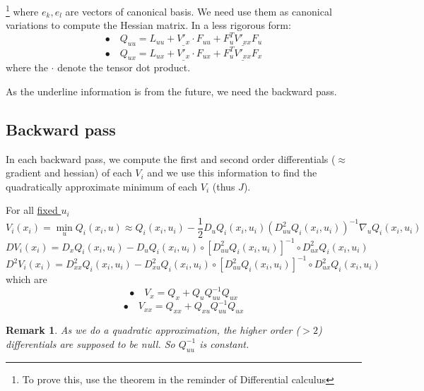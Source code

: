 \documentclass{report}
\newtheorem*{remark}{Remark}
\begin{document}
\footnote{To prove this, use the theorem in the reminder of Differential calculus}
where $e_k, e_l$ are vectors of canonical basis. We need use them as canonical variations to compute the Hessian matrix. In a less rigorous form:
\begin{equation}
\bullet \quad Q_{uu} = L_{uu} + \underline{V'_x} \cdot F_{uu} + F_u^T \underline{V'_{xx}} F_u
\end{equation}
\begin{equation}
\bullet \quad Q_{ux} = L_{ux} + \underline{V'_x} \cdot F_{ux} + F_u^T \underline{V'_{xx}} F_x
\end{equation}
where the $\cdot$ denote the tensor dot product.




As the underline information is from the future, we need the backward pass.

\subsection{Backward pass}
In each backward pass, we compute the first and second order differentials ($\approx$gradient and hessian) of each $V_i$ and we use this information to find the quadratically approximate minimum of each $V_i$ (thus $J$).%

For all \underline{fixed $u_i$}
\begin{equation}
\label{V approx}
V_i(x_i) =\min_u Q_i(x_i,u) \approx Q_i(x_i, u_i) - \frac{1}{2} D_u Q_i (x_i, u_i) (D_{uu}^2 Q_i (x_i, u_i))^{-1} \nabla_u Q_i (x_i, u_i)
\end{equation}
\begin{equation}
    DV_i(x_i)  = D_x Q_i(x_i,u_i) - D_u Q_i (x_i, u_i) \circ [D_{uu}^2 Q_i (x_i, u_i)]^{-1} \circ D_{ux}^2 Q_i (x_i,u_i)
\end{equation}
\begin{equation}
    D^2 V_i(x_i) = D_{xx}^2 Q_i(x_i, u_i) - D_{xu}^2 Q_i (x_i,u_i) \circ [D_{uu}^2 Q_i (x_i, u_i)]^{-1} \circ D_{ux}^2 Q_i (x_i,u_i)
\end{equation}
which are
\begin{equation}
\bullet \quad V_x = Q_x + Q_u Q_{uu}^{-1} Q_{ux}
\end{equation}
\begin{equation}
\bullet \quad V_{xx} = Q_{xx} + Q_{xu} Q_{uu}^{-1} Q_{ux}
\end{equation}
\begin{remark}
As we do a quadratic approximation, the higher order ($>2$) differentials are supposed to be null. So $Q_{uu}^{-1}$ is constant.
\end{remark}
\end{document}
